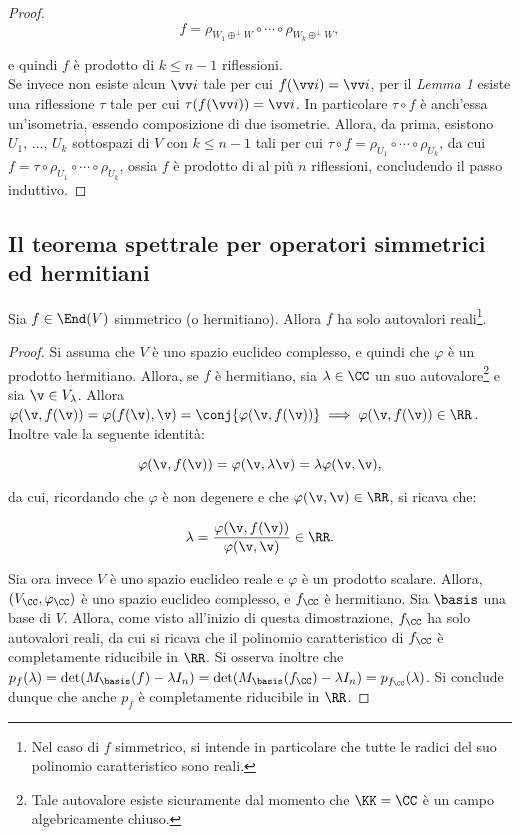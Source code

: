 \begin{proof}
	\[ f = \rho_{W_1 \oplus^\perp W} \circ \cdots \circ \rho_{W_k \oplus^\perp W}, \]
	
	\vskip 0.05in
	
	e quindi $f$ è prodotto di $k \leq n-1$ riflessioni. \\
	
	Se invece non esiste alcun $\vv i$ tale per cui $f(\vv i) = \vv i$, per il \textit{Lemma 1} esiste
	una riflessione $\tau$ tale per cui $\tau(f(\vv i)) = \vv i$. In particolare $\tau \circ f$ è anch'essa
	un'isometria, essendo composizione di due isometrie. Allora, da prima, esistono $U_1$, ..., $U_k$ sottospazi
	di $V$ con $k \leq n-1$ tali per cui $\tau \circ f = \rho_{U_1} \circ \cdots \circ \rho_{U_k}$, da
	cui $f = \tau \circ \rho_{U_1} \circ \cdots \circ \rho_{U_k}$, ossia $f$ è prodotto di al più
	$n$ riflessioni, concludendo il passo induttivo.
\end{proof}

\setcounter{lemma}{0}

\subsection{Il teorema spettrale per operatori simmetrici ed hermitiani}

\begin{lemma}
	Sia $f \in \End(V)$ simmetrico (o hermitiano). Allora $f$ ha solo autovalori reali\footnote{Nel caso
		di $f$ simmetrico, si intende in particolare che tutte le radici del suo polinomio caratteristico
		sono reali.}.
\end{lemma}

\begin{proof}
	Si assuma che $V$ è uno spazio euclideo complesso, e quindi che $\varphi$ è un prodotto hermitiano. Allora,
	se $f$ è hermitiano, sia $\lambda \in \CC$ un suo autovalore\footnote{Tale autovalore esiste sicuramente dal momento
		che $\KK = \CC$ è un campo algebricamente chiuso.} e sia $\v \in V_\lambda$. Allora $\varphi(\v, f(\v)) =
	\varphi(f(\v), \v) = \conj{\varphi(\v, f(\v))} \implies \varphi(\v, f(\v)) \in \RR$. Inoltre vale
	la seguente identità:
	
	\[ \varphi(\v, f(\v)) = \varphi(\v, \lambda \v) = \lambda \varphi(\v, \v), \]
	
	da cui, ricordando che $\varphi$ è non degenere e che $\varphi(\v, \v) \in \RR$, si ricava che:
	
	\[ \lambda = \frac{\varphi(\v, f(\v))}{\varphi(\v, \v)} \in \RR. \]
	
	\vskip 0.05in
	
	Sia ora invece $V$ è uno spazio euclideo reale e $\varphi$ è un prodotto scalare. Allora, $(V_\CC, \varphi_\CC)$
	è uno spazio euclideo complesso, e $f_\CC$ è hermitiano. Sia $\basis$ una base di $V$. Allora, come visto all'inizio di questa
	dimostrazione, $f_\CC$ ha solo autovalori reali, da cui si ricava che il polinomio caratteristico
	di $f_\CC$ è completamente riducibile in $\RR$. Si osserva inoltre che $p_f(\lambda) = \det(M_\basis(f) - \lambda I_n) = \det(M_\basis(f_\CC) - \lambda I_n) = p_{f_\CC}(\lambda)$. Si conclude dunque che
	anche $p_f$ è completamente riducibile in $\RR$.
\end{proof}

